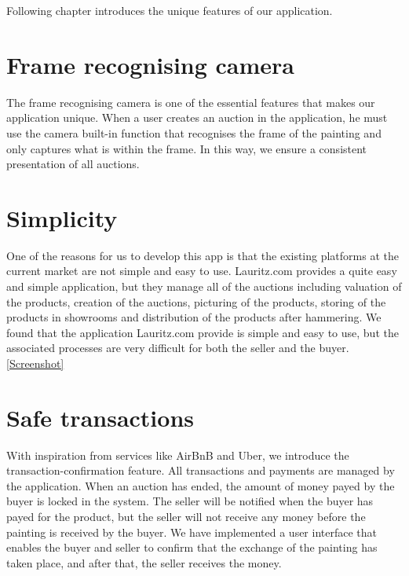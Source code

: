 Following chapter introduces the unique features of our application. 

\section*{Frame recognising camera}
The frame recognising camera is one of the essential features that makes our application unique. When a user creates an auction in the application, he must use the camera built-in function that recognises the frame of the painting and only captures what is within the frame. In this way, we ensure a consistent presentation of all auctions.\cite{Wareable} 

\section*{Simplicity}
One of the reasons for us to develop this app is that the existing platforms at the current market are not simple and easy to use. Lauritz.com provides a quite easy and simple application, but they manage all of the auctions including valuation of the products, creation of the auctions, picturing of the products, storing of the products in showrooms and distribution of the products after hammering. We found that the application Lauritz.com provide is simple and easy to use, but the associated processes are very difficult for both the seller and the buyer. \ref{Screenshot}


\section*{Safe transactions}
With inspiration from services like AirBnB and Uber, we introduce the transaction-confirmation feature. All transactions and payments are managed by the application. When an auction has ended, the amount of money payed by the buyer is locked in the system. The seller will be notified when the buyer has payed for the product, but the seller will not receive any money before the painting is received by the buyer. We have implemented a user interface that enables the buyer and seller to confirm that the exchange of the painting has taken place, and after that, the seller receives the money.  